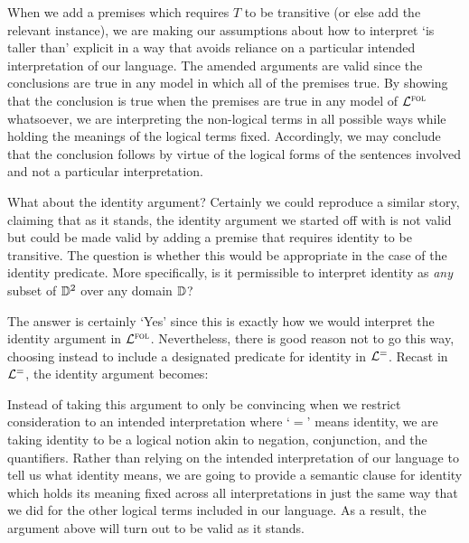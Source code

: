 When we add a premises which requires $T$ to be transitive (or else add the relevant instance), we are making our assumptions about how to interpret `is taller than' explicit in a way that avoids reliance on a particular intended interpretation of our language.
The amended arguments are valid since the conclusions are true in any model in which all of the premises true. 
By showing that the conclusion is true when the premises are true in any model of $\mathcal{L}^{\textsc{fol}}$ whatsoever, we are interpreting the non-logical terms in all possible ways while holding the meanings of the logical terms fixed.
Accordingly, we may conclude that the conclusion follows by virtue of the logical forms of the sentences involved and not a particular interpretation.

What about the identity argument?
Certainly we could reproduce a similar story, claiming that as it stands, the identity argument we started off with is not valid but could be made valid by adding a premise that requires identity to be transitive.
The question is whether this would be appropriate in the case of the identity predicate.
More specifically, is it permissible to interpret identity as \textit{any} subset of $\mathbb{D}^2$ over any domain $\mathbb{D}$?

The answer is certainly `Yes' since this is exactly how we would interpret the identity argument in $\mathcal{L}^{\textsc{fol}}$.
Nevertheless, there is good reason not to go this way, choosing instead to include a designated predicate for identity in $\mathcal{L}^{=}$.
Recast in $\mathcal{L}^{=}$, the identity argument becomes:

\begin{earg}
\end{earg}

Instead of taking this argument to only be convincing when we restrict consideration to an intended interpretation where `$=$' means identity, we are taking identity to be a logical notion akin to negation, conjunction, and the quantifiers.
Rather than relying on the intended interpretation of our language to tell us what identity means, we are going to provide a semantic clause for identity which holds its meaning fixed across all interpretations in just the same way that we did for the other logical terms included in our language.
As a result, the argument above will turn out to be valid as it stands.

